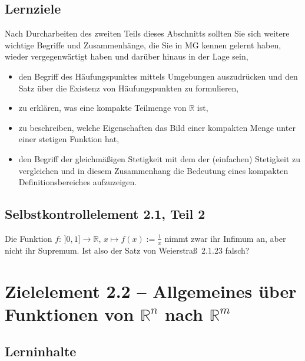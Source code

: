 \documentclass[a4paper,12pt]{article}
\begin{document}
\subsection*{Lernziele}

Nach Durcharbeiten des zweiten Teils dieses Abschnitts sollten Sie sich weitere
wichtige Begriffe und Zusammenhänge, die Sie in MG kennen gelernt haben, wieder
vergegenwärtigt haben und darüber hinaus in der Lage sein,
\begin{itemize}
  \item den Begriff des Häufungspunktes mittels Umgebungen auszudrücken und den
        Satz über die Existenz von Häufungspunkten zu formulieren,
  \item zu erklären, was eine kompakte Teilmenge von $\mathbb{R}$ ist,
  \item zu beschreiben, welche Eigenschaften das Bild einer kompakten Menge unter
        einer stetigen Funktion hat,
  \item den Begriff der gleichmäßigen Stetigkeit mit dem der (einfachen) Stetigkeit
        zu vergleichen und in diesem Zusammenhang die Bedeutung eines kompakten
        Definitionsbereiches aufzuzeigen.
\end{itemize}

\subsection*{Selbstkontrollelement 2.1, Teil 2}

Die Funktion $f : \,]0,1] \to \mathbb{R}$, $x \mapsto f(x) := \tfrac{1}{x}$ nimmt zwar
ihr Infimum an, aber nicht ihr Supremum. Ist also der Satz von Weierstraß~2.1.23
falsch?

\newpage

\section*{Zielelement 2.2 -- Allgemeines über Funktionen von $\mathbb{R}^n$ nach $\mathbb{R}^m$}

\subsection*{Lerninhalte}
\end{document}
